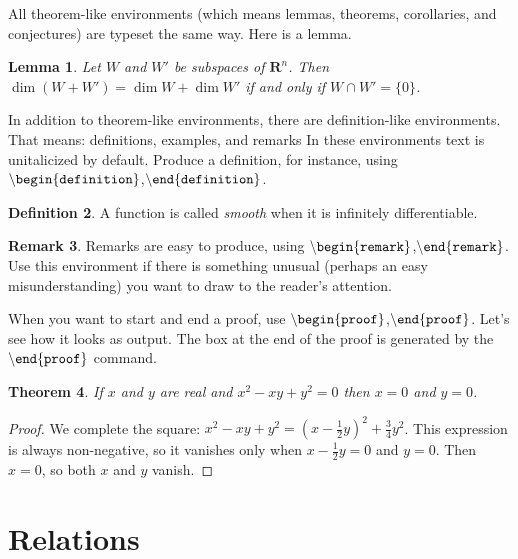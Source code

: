 \documentclass[12pt,letterpaper]{amsart}
\newcommand{\RR}{\mathbf R}
\newcommand{\sm}{\setminus}
\newcommand{\bgn}[1]{$\tt {\sm}begin\{#1\}$}
\newcommand{\nd}[1]{$\tt {\sm}end\{#1\}$}
\theoremstyle{plain}
\newtheorem{theorem}{Theorem}[section]
\newtheorem{lemma}[theorem]{Lemma}
\theoremstyle{definition}
\newtheorem{definition}[theorem]{Definition}
\newtheorem{remark}[theorem]{Remark}
\numberwithin{equation}{section}
\begin{document}
All theorem-like environments (which means lemmas, theorems, corollaries, 
and conjectures) are typeset the same way.  Here is a lemma.

\begin{lemma}
Let $W$ and $W'$ be subspaces of $\RR^n$.  
Then $\dim(W + W') = \dim W + \dim W'$ if and only if 
$W \cap W' = \{0\}$.
\end{lemma}



In addition to theorem-like environments, 
there are definition-like environments. 
That means: definitions, examples, and remarks
In these environments text is unitalicized by default. 
Produce a definition, for instance, using  
\bgn{definition},\nd{definition}.

\begin{definition}
A function is called {\it smooth} when it is infinitely differentiable. 
\end{definition}

\begin{remark}
Remarks are easy to produce, using 
\bgn{remark},\nd{remark}.
Use this 
environment if there is something unusual (perhaps an easy misunderstanding) 
you want to draw to the reader's attention.
\end{remark}


When you want to start and end a proof, use 
\bgn{proof},\nd{proof}.
Let's see how it looks as output.
The box at the end of the proof is generated by the \nd{proof} command.


\begin{theorem}
If $x$ and $y$ are real and $x^2 - xy + y^2 = 0$ then $x = 0$ and 
$y = 0$.
\end{theorem}

\begin{proof}
We complete the square: $x^2 - xy + y^2 = (x - \frac{1}{2}y)^2 + 
\frac{3}{4}y^2$.  This expression is always non-negative, so it 
vanishes only when $x - \frac{1}{2}y = 0$ and $y = 0$.  Then 
$x = 0$, so both $x$ and $y$ vanish. 
\end{proof}




\section{Relations}\label{notsec}
\end{document}
